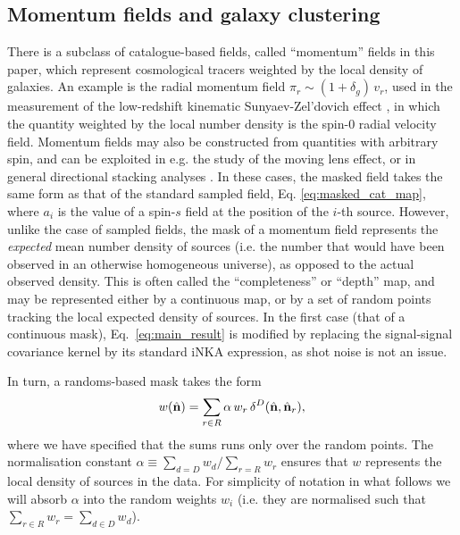 \documentclass[aps,twocolumn, superscriptaddress, english, nofootinbib, 10pt]{revtex4-2}
\newcommand{\nv}{\hat{\bf n}}
\begin{document}
  \subsection{Momentum fields and galaxy clustering}\label{ssec:theo.clust}
    There is a subclass of catalogue-based fields, called ``momentum'' fields in this paper, which represent cosmological tracers weighted by the local density of galaxies. An example is the radial momentum field $\pi_r\sim (1+\delta_g)\,v_r$, used in the measurement of the low-redshift kinematic Sunyaev-Zel'dovich effect \cite{2512.14625,2604.19744}, in which the quantity weighted by the local number density is the spin-0 radial velocity field. Momentum fields may also be constructed from quantities with arbitrary spin, and can be exploited in e.g. the study of the moving lens effect, or in general directional stacking analyses \cite{2605.15947,2605.18938}. In these cases, the masked field takes the same form as that of the standard sampled field, Eq. \ref{eq:masked_cat_map}, where $a_i$ is the value of a spin-$s$ field at the position of the $i$-th source. However, unlike the case of sampled fields, the mask of a momentum field represents the \emph{expected} mean number density of sources (i.e. the number that would have been observed in an otherwise homogeneous universe), as opposed to the actual observed density. This is often called the ``completeness'' or ``depth'' map, and may be represented either by a continuous map, or by a set of random points tracking the local expected density of sources. In the first case (that of a continuous mask), Eq.~\ref{eq:main_result} is modified by replacing the signal-signal covariance kernel by its standard iNKA expression, as shot noise is not an issue. 

    In turn, a randoms-based mask takes the form
    \begin{equation}
      w(\nv)=\sum_{r\in R} \alpha\,w_r\,\delta^D(\nv,\nv_r),
    \end{equation}
    where we have specified that the sums runs only over the random points. The normalisation constant $\alpha\equiv\sum_{d=D}w_d/\sum_{r=R}w_r$ ensures that $w$ represents the local density of sources in the data. For simplicity of notation in what follows we will absorb $\alpha$ into the random weights $w_i$ (i.e. they are normalised such that $\sum_{r\in R}w_r=\sum_{d\in D}w_d$).
    
\end{document}
